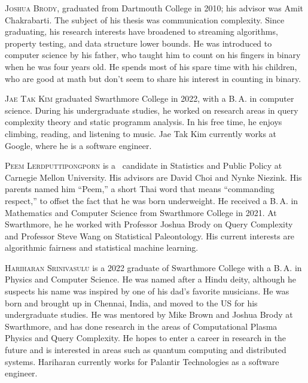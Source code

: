 \documentclass{toc}
\begin{document}
%
%
%
%
%
%
%
%
%
%
%
%
%
%
%
%
%
%
%
%
\begin{tocaboutauthors}
  \begin{tocabout}[brody]
    \textsc{Joshua Brody}, graduated from Dartmouth College in 2010;
    his advisor was Amit Chakrabarti.  The subject of his thesis was
    communication complexity.  Since graduating, his research
    interests have broadened to streaming algorithms, property
    testing, and data structure lower bounds.  He was introduced to
    computer science by his father, who taught him to count on his
    fingers in binary when he was four years old.
    He spends most of his spare time with his children,
    who are good at math but don't seem
    to share his interest in counting in binary.
  \end{tocabout}
  \begin{tocabout}[kim]  
    \textsc{Jae Tak Kim} graduated Swarthmore College in 2022, with a
    B.\,A. in computer science.  During his undergraduate studies, he
    worked on research areas in query complexity theory and static
    programm analysis.  In his free time, he enjoys climbing, reading,
    and listening to music.  Jae Tak Kim %
    currently works at Google, where he is a software engineer.
  \end{tocabout}
  \begin{tocabout}[lerdputtipongporn]
    \textsc{Peem Lerdputtipongporn} is a \phd\ candidate in Statistics
    and Public Policy at Carnegie Mellon University.
    His advisors are David Choi and Nynke Niezink.
    His parents named him ``Peem,'' a short Thai word that means
    ``commanding respect,'' to offset the fact that he was born
    underweight. He received a B.\,A. in Mathematics and Computer
    Science from Swarthmore College in 2021.
    At Swarthmore, he 
    he worked  %
    with Professor Joshua Brody on Query
    Complexity and Professor Steve Wang on Statistical
    Paleontology. His current interests are algorithmic fairness and
    statistical machine learning.
  \end{tocabout}
  \begin{tocabout}[srinivasulu]
    \textsc{Hariharan Srinivasulu} is a 2022 
    graduate of Swarthmore
    College with a B.\,A. in Physics and Computer Science. He was named
    after a Hindu deity, although he suspects his name was inspired by
    one of his dad’s favorite musicians. He was born and brought up in
    Chennai, India, and moved to the US for his undergraduate
    studies. He was mentored by Mike Brown and Joshua Brody at
    Swarthmore, and has done research in the areas of Computational
    Plasma Physics and Query Complexity. He hopes to enter a career in
    research in the future and is interested in areas such as quantum
    computing and distributed systems.
    Hariharan currently works for Palantir Technologies as a software engineer.
  \end{tocabout}
\end{tocaboutauthors}
\end{document}
